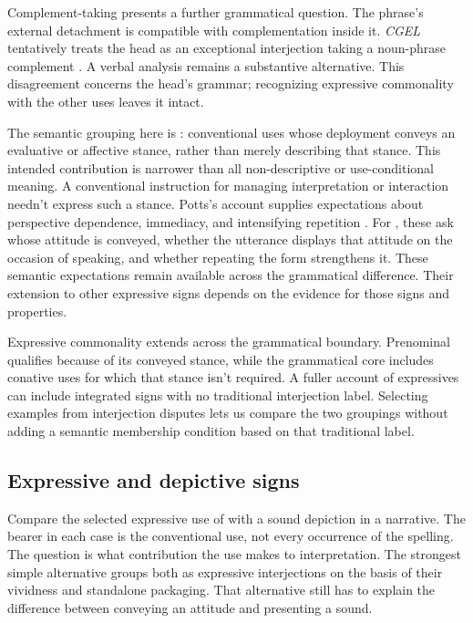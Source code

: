 \documentclass[12pt]{article}
\begin{document}
Complement-taking  presents a further
grammatical question. The phrase's external detachment is compatible with
complementation inside it. \textit{CGEL} tentatively treats the head as
an exceptional interjection taking a noun-phrase complement
\citep[1361 n.~70]{HuddlestonPullum2002}. A verbal analysis remains a
substantive alternative. This disagreement concerns the head's grammar;
recognizing expressive commonality with the other  uses
leaves it intact.

The semantic grouping here is : conventional uses
whose deployment conveys an evaluative or affective stance, rather than
merely describing that stance. This intended contribution is narrower than
all non-descriptive or use-conditional meaning. A conventional instruction
for managing interpretation or interaction needn't express such a stance.
Potts's account supplies expectations about perspective dependence, immediacy,
and intensifying repetition \citep[166--167]{potts2007}. For ,
these ask whose attitude is conveyed, whether the utterance displays
that attitude on the occasion of speaking, and whether repeating the
form strengthens it. These semantic expectations remain available across
the grammatical difference. Their extension to other expressive signs
depends on the evidence for those signs and properties.

Expressive commonality extends across the grammatical boundary. Prenominal
 qualifies because of its conveyed stance, while the
grammatical core includes conative uses for which that stance isn't
required. A fuller account of expressives can include integrated signs
with no traditional interjection label. Selecting examples from interjection
disputes lets us compare the two groupings without adding a semantic
membership condition based on that traditional label.

\subsection{Expressive and depictive signs}\label{sec:expressive-depictive}

Compare the selected expressive use of  with a sound depiction
 in a narrative. The bearer in each case is the conventional
use, not every occurrence of the spelling. The question is what contribution
the use makes to interpretation. The strongest simple alternative groups
both as expressive interjections on the basis of their vividness and
standalone packaging. That alternative still has to explain the difference
between conveying an attitude and presenting a sound.
\end{document}
